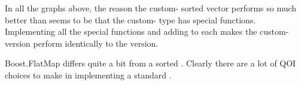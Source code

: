 In all the graphs above, the reason the custom- sorted vector
performs so much better than  seems to be that
the custom- type has  special functions.
Implementing all the special functions and adding  to
each makes the custom- version perform identically to the
 version.

Boost.FlatMap differs quite a bit from a sorted .  Clearly there
are a lot of QOI choices to make in implementing a standard .
